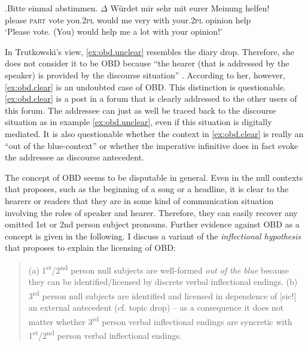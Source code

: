 \exg.\label{ex:obd.clear}Bitte einmal abstimmen. $\Delta$ Würdet mir sehr mit eurer Meinung helfen!\\
please \textsc{part} vote you.\textsc{2pl} would me very with your.\textsc{2pl} opinion help \\
`Please vote. (You) would help me a lot with your opinion!' \citep[191]{trutkowski2016}

In Trutkowski's view, \ref{ex:obd.unclear} resembles the  diary drop.
Therefore, she does not consider it to be OBD because ``the hearer (that is addressed by the speaker) is provided by the discourse situation'' \citep[191]{trutkowski2016}.
According to her, however, \ref{ex:obd.clear} is an undoubted case of OBD.
This distinction is questionable.
\ref{ex:obd.clear} is a post in a forum that is clearly addressed to the other users of this forum.
The addressee can just as well be traced back to the discourse situation as in example \ref{ex:obd.unclear}, even if this situation is digitally mediated.
It is also questionable whether the context in \ref{ex:obd.clear} is really an ``out of the blue-context'' or whether the imperative infinitive does in fact evoke the addressee as discourse antecedent. 

The concept of OBD seems to be disputable in general.
Even in the null contexts that \citet{trutkowski2016} proposes, such as the beginning of a song or a headline, it is clear to the hearers or readers that they are in some kind of communication situation involving the roles of speaker and hearer.
Therefore, they can easily recover  any omitted 1st or 2nd person subject pronouns.
Further evidence against OBD as a concept is given in the following.
I discuss a variant of the \textit{inflectional hypothesis} that \citet{trutkowski2016} proposes to explain the licensing of OBD:

\begin{quote}
(a) 1\textsuperscript{st}/2\textsuperscript{nd} person null subjects are well-formed \textit{out of the blue} because they can be identified/licensed by discrete verbal inflectional endings.\newline
(b) 3\textsuperscript{rd} person null subjects are identified and licensed in dependence of [sic!] an external antecedent  (cf. topic drop) -- as a consequence it does not matter whether 3\textsuperscript{rd} person verbal inflectional endings are syncretic with 1\textsuperscript{st}/2\textsuperscript{nd} person verbal inflectional endings. \citep[218]{trutkowski2016}
\end{quote}

